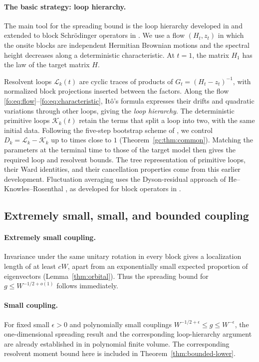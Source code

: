 \documentclass[11pt]{article}
\numberwithin{equation}{section}
\theoremstyle{remark}
\newcommand{\cL}{\mathcal L}
\newcommand{\cK}{\mathcal K}
\begin{document}
\paragraph{The basic strategy: loop hierarchy.}
The main tool for the spreading bound is the loop hierarchy developed
in \cite[Sections~2 and~5]{YY} and extended to block Schr\"odinger
operators in \cite[Sections~3--7]{TYY}. We use a flow $(H_t,z_t)$ in which the onsite blocks
are independent Hermitian Brownian motions and the spectral height
decreases along a deterministic characteristic. At $t=1$, the matrix
$H_1$ has the law of the target matrix $H$.

Resolvent loops $\cL_k(t)$ are cyclic traces of products of
$G_t=(H_t-z_t)^{-1}$, with normalized block projections inserted
between the factors. Along the flow
\eqref{fo:eq:flow}--\eqref{fo:eq:characteristic}, It\^o's formula
expresses their drifts and quadratic variations through other
loops, giving the \emph{loop hierarchy}. The deterministic
primitive loops $\cK_k(t)$ retain the terms that split a loop into
two, with the same initial data. Following the five-step bootstrap
scheme of \cite{YY,TYY}, we control
$D_k=\cL_k-\cK_k$ up to times close to $1$
(Theorem~\ref{gc:thm:common}). Matching the parameters at the terminal
time to those of the target model then gives the required loop and
resolvent bounds.
The tree representation of primitive loops, their Ward identities,
and their cancellation properties come from this earlier development.
Fluctuation averaging uses the Dyson-residual approach of
He--Knowles--Rosenthal \cite{HKR}, as developed for block operators
in \cite[Section~6]{TYY}.

\subsection{Extremely small, small, and bounded coupling}

\paragraph{Extremely small coupling.}
Invariance under the same unitary rotation in every block gives a
localization length of at least $cW$, apart from an exponentially small
expected proportion of eigenvectors (Lemma~\ref{thm:orbital}).
Thus the spreading bound for $g\le W^{-1/2+o(1)}$ follows immediately.

\paragraph{Small coupling.}
For fixed small $\epsilon>0$ and polynomially small couplings
$W^{-1/2+\epsilon}\le g\le W^{-\epsilon}$, the one-dimensional spreading result and the corresponding
loop-hierarchy argument are already established in
\cite[Theorem~2.1]{TYY} in polynomial finite volume. The corresponding
resolvent moment bound here is included in Theorem~\ref{thm:bounded-lower}.
\end{document}
